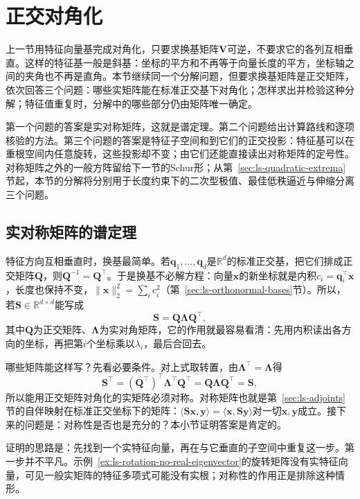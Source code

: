 
\section{正交对角化}
\label{sec:ls-spectral-theory}

上一节用特征向量基完成对角化，只要求换基矩阵$\bm V$可逆，不要求它的各列互相垂直。这样的特征基一般是斜基：坐标的平方和不再等于向量长度的平方，坐标轴之间的夹角也不再是直角。本节继续同一个分解问题，但要求换基矩阵是正交矩阵，依次回答三个问题：哪些实矩阵能在标准正交基下对角化；怎样求出并检验这种分解；特征值重复时，分解中的哪些部分仍由矩阵唯一确定。

第一个问题的答案是实对称矩阵，这就是谱定理。第二个问题给出计算路线和逐项核验的方法。第三个问题的答案是特征子空间和到它们的正交投影：特征基可以在重根空间内任意旋转，这些投影却不变；由它们还能直接读出对称矩阵的定号性。对称矩阵之外的一般方阵留给下一节的Schur形；从第~\ref{sec:ls-quadratic-extrema}节起，本节的分解将分别用于长度约束下的二次型极值、最佳低秩逼近与伸缩分离三个问题。

\subsection{实对称矩阵的谱定理}
\label{sec:ls-symmetric-spectral-decomposition}

特征方向互相垂直时，换基最简单。若$\bm q_1,\ldots,\bm q_d$是$\mathbb R^d$的标准正交基，把它们排成正交矩阵$\bm Q$，则$\bm Q^{-1}=\bm Q^\top$。于是换基不必解方程：向量$\bm x$的新坐标就是内积$c_i=\bm q_i^\top\bm x$，长度也保持不变，$\lVert\bm x\rVert_2^2=\sum_ic_i^2$（第~\ref{sec:ls-orthonormal-bases}节）。所以，若$\bm S\in\mathbb R^{d\times d}$能写成
\[
 \bm S=\bm Q\bm\Lambda\bm Q^\top,
\]
其中$\bm Q$为正交矩阵、$\bm\Lambda$为实对角矩阵，它的作用就最容易看清：先用内积读出各方向的坐标，再把第$i$个坐标乘以$\lambda_i$，最后合回去。

哪些矩阵能这样写？先看必要条件。对上式取转置，由$\bm\Lambda^\top=\bm\Lambda$得
\[
 \bm S^\top=(\bm Q^\top)^\top\bm\Lambda^\top\bm Q^\top=\bm Q\bm\Lambda\bm Q^\top=\bm S,
\]
所以能用正交矩阵对角化的实矩阵必须对称。对称矩阵也就是第~\ref{sec:ls-adjoints}节的自伴映射在标准正交坐标下的矩阵：$\langle\bm S\bm x,\bm y\rangle=\langle\bm x,\bm S\bm y\rangle$对一切$\bm x,\bm y$成立。接下来的问题是：对称性是否也是充分的？本小节证明答案是肯定的。

证明的思路是：先找到一个实特征向量，再在与它垂直的子空间中重复这一步。第一步并不平凡。示例~\ref{ex:ls-rotation-no-real-eigenvector}的旋转矩阵没有实特征向量，可见一般实矩阵的特征多项式可能没有实根；对称性的作用正是排除这种情形。

